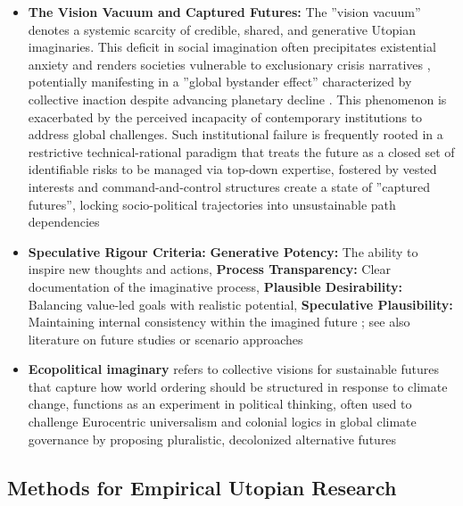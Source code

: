\documentclass[jou,floatsintext]{apa7}
\begin{document}
\begin{itemize}
\begin{itemize}
\begin{itemize}
        \item[$\rightarrow$] \textbf{The Vision Vacuum and Captured Futures:} The ''vision vacuum'' denotes a systemic scarcity of credible, shared, and generative Utopian imaginaries. This deficit in social imagination often precipitates existential anxiety and renders societies vulnerable to exclusionary crisis narratives \parencite{amlingerZerstoerungslustElementeDemokratischen2025}, potentially manifesting in a ''global bystander effect'' characterized by collective inaction despite advancing planetary decline \parencite{corkExploringAlternativeFutures2023}. This phenomenon is exacerbated by the perceived incapacity of contemporary institutions to address global challenges. Such institutional failure is frequently rooted in a restrictive technical-rational paradigm that treats the future as a closed set of identifiable risks to be managed via top-down expertise, fostered by vested interests and command-and-control structures create a state of ''captured futures'', locking socio-political trajectories into unsustainable path dependencies \parencite{hajerCapturedFuturesRethinking2025}
        \item \textbf{Speculative Rigour Criteria:} \textbf{Generative Potency:} The ability to inspire new thoughts and actions, \textbf{Process Transparency:} Clear documentation of the imaginative process, \textbf{Plausible Desirability:} Balancing value-led goals with realistic potential, \textbf{Speculative Plausibility:} Maintaining internal consistency within the imagined future \parencite{corkExploringAlternativeFutures2023}; see also literature on future studies \parencite[e.g.,][]{masiniRethinkingFuturesStudies2006} or scenario approaches  \parencite[e.g.,][]{kosowMethodsFutureScenario2008, wiebeScenarioDevelopmentForesight2018, wrightEthicalDilemmaScenarios2014}
        \item \textbf{Ecopolitical imaginary} refers to collective visions for sustainable futures that capture how world ordering should be structured in response to climate change, functions as an experiment in political thinking, often used to challenge Eurocentric universalism and colonial logics in global climate governance by proposing pluralistic, decolonized alternative futures \parencite{hatzisavvidouEnvisioningEcopoliticalFutures2024}
    \end{itemize}
\end{itemize}
\end{itemize}


\subsection{Methods for Empirical Utopian Research}
\end{document}
